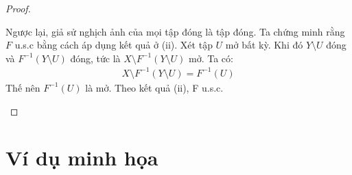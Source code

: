 \documentclass{article}
\begin{document}
\begin{proof}
\begin{enumerate}[label=(\roman*)]
        Ngược lại, giả sử nghịch ảnh của mọi tập đóng là tập đóng. Ta chứng minh rằng $F$ u.s.c bằng cách áp dụng kết quả ở (ii). Xét tập $U$ mở bất kỳ. Khi đó $Y \setminus U$ đóng và $F^{-1}(Y\setminus U)$ đóng, tức là $X \setminus F^{-1}(Y \setminus U)$ mở. Ta có:
        \begin{align}
            X \setminus F^{-1}(Y \setminus U) = F^{-1}(U)
        \end{align}
        Thế nên $F^{-1}(U)$ là mở. Theo kết quả (ii), F u.s.c.
    \end{enumerate}
\end{proof}

\section{Ví dụ minh họa}
\end{document}
